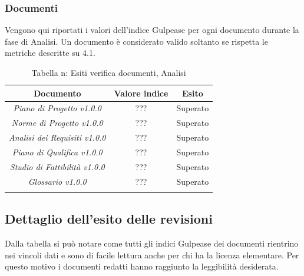 \subsubsection{Documenti}
Vengono qui riportati i valori dell’indice Gulpease per ogni documento durante la fase
di Analisi. Un documento è considerato valido soltanto se rispetta le metriche descritte
su 4.1.
\begin{longtable}{|c|c|c|}
\hline
\textbf{Documento} & \textbf{Valore indice} & \textbf{Esito} \\
\hline
	\emph{Piano di Progetto v1.0.0} & {???} & {Superato}\\
\hline
	\emph{Norme di Progetto v1.0.0} & {???} & {Superato}\\
\hline
	\emph{Analisi dei Requisiti v1.0.0} & {???} & {Superato}\\
\hline
	\emph{Piano di Qualifica v1.0.0} & {???} & {Superato}\\
\hline
	\emph{Studio di Fattibilità v1.0.0} & {???} & {Superato}\\
\hline
	\emph{Glossario v1.0.0} & {???} & {Superato}\\
\hline
\caption[Tabella n: Esiti verifica documenti, Analisi]{Tabella n: Esiti verifica documenti, Analisi}
\label{tabella:verifica documenti}
\endhead
\end{longtable}
\subsection{Dettaglio dell’esito delle revisioni}
Dalla tabella si può notare come tutti gli indici Gulpease dei documenti rientrino nei vincoli dati e sono di facile lettura anche per chi ha la licenza elementare. Per questo motivo i documenti redatti hanno raggiunto la leggibilità desiderata.
\pagebreak